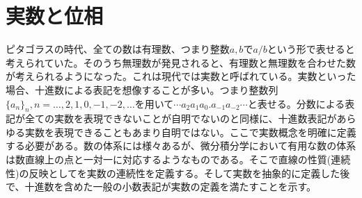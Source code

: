 \section{実数と位相}

ピタゴラスの時代、全ての数は有理数、つまり整数$a, b$で$a/b$という形で表せると考えられていた。そのうち無理数が発見されると、有理数と無理数を合わせた数が考えられるようになった。これは現代では実数と呼ばれている。実数といった場合、十進数による表記を想像することが多い。つまり整数列$\{a_n\}_n, n = \ldots, 2, 1, 0, -1, -2,\ldots$を用いて$\cdots a_2a_1a_0.a_{-1}a_{-2}\cdots$と表せる。分数による表記が全ての実数を表現できないことが自明でないのと同様に、十進数表記があらゆる実数を表現できることもあまり自明ではない。ここで実数概念を明確に定義する必要がある。数の体系には様々あるが、微分積分学において有用な数の体系は数直線上の点と一対一に対応するようなものである。そこで直線の性質(連続性)の反映としてを実数の連続性を定義する。そして実数を抽象的に定義した後で、十進数を含めた一般の小数表記が実数の定義を満たすことを示す。

